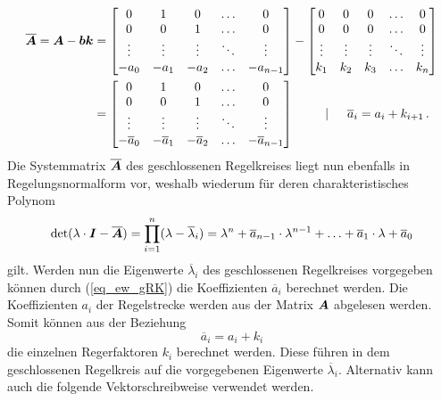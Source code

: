 \begin{equation}
\begin{split}
\boldsymbol{\overline{A}} = \boldsymbol{A}-\boldsymbol{b}\boldsymbol{k} &= \begin{bmatrix}
0 & 1 & 0 & \hdots & 0 \\
0 & 0 & 1 & \hdots & 0 \\
\vdots & \vdots & \vdots & \ddots & \vdots \\
-a_{\text{0}} & -a_{\text{1}} & -a_{\text{2}} & \hdots & -a_{n-1}
\end{bmatrix}
-
\begin{bmatrix}
0 & 0 & 0 & \hdots & 0 \\
0 & 0 & 0 & \hdots & 0 \\
\vdots & \vdots & \vdots &  \ddots & \vdots \\
k_{\text{1}} & k_{\text{2}} & k_{\text{3}} & \hdots & k_n
\end{bmatrix}
\\
&= \begin{bmatrix}
0 & 1 & 0 & \hdots & 0 \\
0 & 0 & 1 & \hdots & 0 \\
\vdots & \vdots & \vdots & \ddots & \vdots \\
-\overline{a}_{\text{0}} & -\overline{a}_{\text{1}} & -\overline{a}_{\text{2}} & \hdots & -\overline{a}_{n-1}
\end{bmatrix}
\hspace{25pt} \vert \hspace{15pt} \overline{a}_i = a_i + k_{i+1} \,.
\end{split}
\end{equation}
Die Systemmatrix $\boldsymbol{\overline{A}}$ des geschlossenen Regelkreises liegt nun ebenfalls in Regelungsnormalform vor, weshalb wiederum für deren charakteristisches Polynom
\begin{equation}
\text{det}(\lambda\cdot \boldsymbol{I}-\boldsymbol{\overline{A}}) = \prod^n_{i=1} (\lambda-\overline{\lambda}_i) = \lambda^n+\overline{a}_{n-1}\cdot \lambda^{n-1} + \hdots + \overline{a}_{\text{1}}\cdot \lambda + \overline{a}_{\text{0}}
\label{eq_ew_gRK}
\end{equation}
gilt. Werden nun die Eigenwerte $\overline{\lambda}_i$ des geschlossenen Regelkreises vorgegeben können durch (\ref{eq_ew_gRK}) die Koeffizienten $\overline{a}_i$ berechnet werden. Die Koeffizienten $a_i$ der Regelstrecke werden aus der Matrix $\boldsymbol{A}$ abgelesen werden. Somit können aus der Beziehung
\begin{equation}
\overline{a}_i = a_i + k_i
\end{equation}
die einzelnen Regerfaktoren $k_i$ berechnet werden. Diese führen in dem geschlossenen Regelkreis auf die vorgegebenen Eigenwerte $\overline{\lambda}_i$. Alternativ kann auch die folgende Vektorschreibweise verwendet werden.
